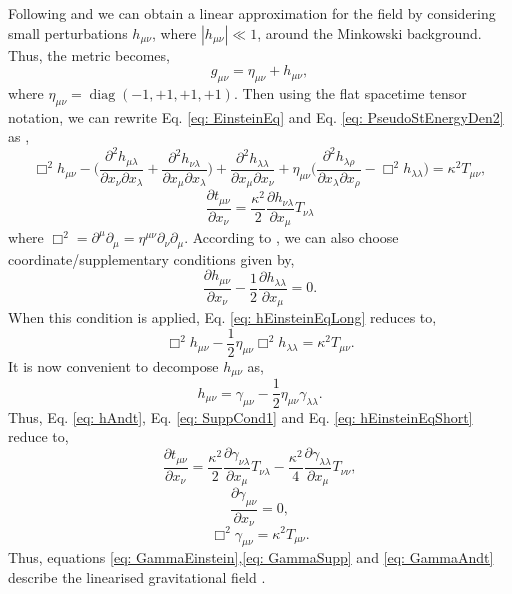 \documentclass[12pt,a4paper]{report}
\theoremstyle{plain}
\theoremstyle{definition}
\theoremstyle{remark}
\newcommand{\mink}{\eta_{\mu\nu}}
\newcommand{\munu}{\mu\nu}
\DeclareMathOperator{\diag}{diag}
\begin{document}
Following \citet{Gupta_1952} and \citet{EinsteinGravWave} we can obtain a linear approximation for the field by considering small perturbations $h_{\munu}$, where $|h_{\munu}| \ll 1$, around the Minkowski background. Thus, the metric becomes,
\begin{equation}
    g_{\munu} = \mink + h_{\munu},
\end{equation}
where $\mink = \diag(-1, +1, +1, +1)$. Then using the flat spacetime tensor notation, we can rewrite Eq. \ref{eq: EinsteinEq} and Eq. \ref{eq: PseudoStEnergyDen2} as \cite{Gupta_1952},
\begin{equation}
    \Box^2h_{\munu} - \Bigg(\frac{\partial^2h_{\mu\lambda}}{\partial x_{\nu}\partial x_{\lambda}} + \frac{\partial^2h_{\nu\lambda}}{\partial x_{\mu}\partial x_{\lambda}}\Bigg) + \frac{\partial^2h_{\lambda\lambda}}{\partial x_{\mu}\partial x_{\nu}} + \mink\Bigg(\frac{\partial^2h_{\lambda\rho}}{\partial x_{\lambda}\partial x_{\rho}} - \Box^2h_{\lambda\lambda} \Bigg) = \kappa^2T_{\munu},
    \label{eq: hEinsteinEqLong}
\end{equation}
\begin{equation}
    \frac{\partial t_{\munu}}{\partial x_{\nu}} = \frac{\kappa^2}{2}\frac{\partial h_{\nu\lambda}}{\partial x_{\mu}}T_{\nu\lambda}
    \label{eq: hAndt}
\end{equation}
where $\Box^2 = \partial^{\mu}\partial_{\mu} = \eta^{\munu}\partial_{\nu}\partial_{\mu}$.
According to \citet{EinsteinGravWave}, we can also choose coordinate/supplementary conditions given by,
\begin{equation}
    \frac{\partial h_{\munu}}{\partial x_{\nu}} -  \frac{1}{2}\frac{\partial h_{\lambda\lambda}}{\partial x_{\mu}} = 0.
    \label{eq: SuppCond1}
\end{equation}
When this condition is applied, Eq. \ref{eq: hEinsteinEqLong} reduces to,
\begin{equation}
    \Box^2h_{\munu} - \frac{1}{2}\mink\Box^2 h_{\lambda\lambda} = \kappa^2T_{\munu}.
    \label{eq: hEinsteinEqShort}
\end{equation}
It is now convenient to decompose $h_{\munu}$ as,
\begin{equation}
    h_{\munu} = \gamma_{\munu} - \frac{1}{2}\mink\gamma_{\lambda\lambda}.
\end{equation}
Thus, Eq. \ref{eq: hAndt}, Eq. \ref{eq: SuppCond1} and Eq. \ref{eq: hEinsteinEqShort} reduce to,
\begin{equation}
    \frac{\partial t_{\munu}}{\partial x_{\nu}} = \frac{\kappa^2}{2}\frac{\partial \gamma_{\nu\lambda}}{\partial x_{\mu}}T_{\nu\lambda} - \frac{\kappa^2}{4}\frac{\partial \gamma_{\lambda\lambda}}{\partial x_{\mu}}T_{\nu\nu},
    \label{eq: GammaAndt}
\end{equation}
\begin{equation}
    \frac{\partial \gamma_{\munu}}{\partial x_{\nu}} = 0,
    \label{eq: GammaSupp}
\end{equation}
\begin{equation}
    \Box^2\gamma_{\munu} = \kappa^2T_{\munu}.
    \label{eq: GammaEinstein}
\end{equation}
Thus, equations \ref{eq: GammaEinstein},\ref{eq: GammaSupp} and \ref{eq: GammaAndt} describe the linearised gravitational field \cite{Gupta_1952}. 
\end{document}
